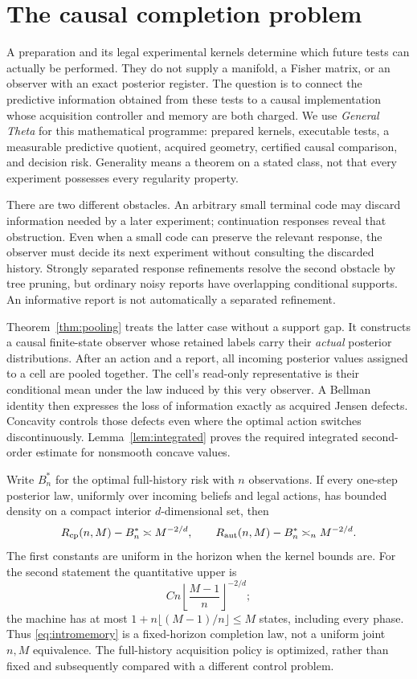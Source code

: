 \section{The causal completion problem}\label{sec:problem}
A preparation and its legal experimental kernels determine which future tests can actually be performed. They do not supply a manifold, a Fisher matrix, or an observer with an exact posterior register. The question is to connect the predictive information obtained from these tests to a causal implementation whose acquisition controller and memory are both charged. We use \emph{General Theta} for this mathematical programme: prepared kernels, executable tests, a measurable predictive quotient, acquired geometry, certified causal comparison, and decision risk. Generality means a theorem on a stated class, not that every experiment possesses every regularity property.

There are two different obstacles. An arbitrary small terminal code may discard information needed by a later experiment; continuation responses reveal that obstruction. Even when a small code can preserve the relevant response, the observer must decide its next experiment without consulting the discarded history. Strongly separated response refinements resolve the second obstacle by tree pruning, but ordinary noisy reports have overlapping conditional supports. An informative report is not automatically a separated refinement.

Theorem~\ref{thm:pooling} treats the latter case without a support gap. It constructs a causal finite-state observer whose retained labels carry their \emph{actual} posterior distributions. After an action and a report, all incoming posterior values assigned to a cell are pooled together. The cell's read-only representative is their conditional mean under the law induced by this very observer. A Bellman identity then expresses the loss of information exactly as acquired Jensen defects. Concavity controls those defects even where the optimal action switches discontinuously. Lemma~\ref{lem:integrated} proves the required integrated second-order estimate for nonsmooth concave values.

Write $B_n^*$ for the optimal full-history risk with $n$ observations. If every one-step posterior law, uniformly over incoming beliefs and legal actions, has bounded density on a compact interior $d$-dimensional set, then
\begin{equation}\label{eq:intromemory}
 R_{\mathrm{cp}}(n,M)-B_n^*\asymp M^{-2/d},\qquad
 R_{\mathrm{aut}}(n,M)-B_n^*\asymp_n M^{-2/d}.
\end{equation}
The first constants are uniform in the horizon when the kernel bounds are. For the second statement the quantitative upper is
\[
 C n\left\lfloor\frac{M-1}{n}\right\rfloor^{-2/d};
\]
the machine has at most $1+n\lfloor(M-1)/n\rfloor\le M$ states, including every phase. Thus \eqref{eq:intromemory} is a fixed-horizon completion law, not a uniform joint $n,M$ equivalence. The full-history acquisition policy is optimized, rather than fixed and subsequently compared with a different control problem.

